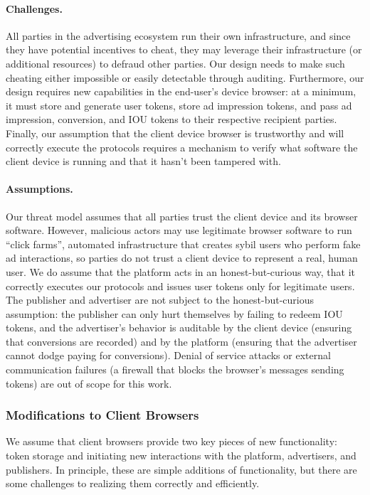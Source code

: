 \paragraph{Challenges.}
%
All parties in the advertising ecosystem run their own infrastructure, and since they have potential incentives to cheat, they may leverage their infrastructure (or additional resources) to defraud other parties.
%
Our design needs to make such cheating either impossible or easily detectable through auditing.
%
Furthermore, our design requires new capabilities in the end-user's device browser: at a minimum, it must store and generate user tokens, store ad impression tokens, and pass ad impression, conversion, and IOU tokens to their respective recipient parties.
%
Finally, our assumption that the client device browser is trustworthy and will correctly execute the protocols requires a mechanism to verify what software the client device is running and that it hasn't been tampered with.
%

\paragraph{Assumptions.}
%
Our threat model assumes that all parties trust the client device and its browser software.
%
However, malicious actors may use legitimate browser software to run ``click farms'', automated infrastructure that creates sybil users who perform fake ad interactions, so parties do not trust a client device to represent a real, human user.
%
We do assume that the platform acts in an honest-but-curious way, \ie that it correctly executes our protocols and issues user tokens only for legitimate users.
%
The publisher and advertiser are not subject to the honest-but-curious assumption: the publisher can only hurt themselves by failing to redeem IOU tokens, and the advertiser's behavior is auditable by the client device (ensuring that conversions are recorded) and by the platform (ensuring that the advertiser cannot dodge paying for conversions).
%
Denial of service attacks or external communication failures (\eg a firewall that blocks the browser's messages sending tokens) are out of scope for this work.
%

\subsubsection{Modifications to Client Browsers}
\label{s:browser}
%
We assume that client browsers provide two key pieces of new functionality: token storage and initiating new interactions with the platform, advertisers, and publishers.
%
In principle, these are simple additions of functionality, but there are some challenges to realizing them correctly and efficiently.
%

